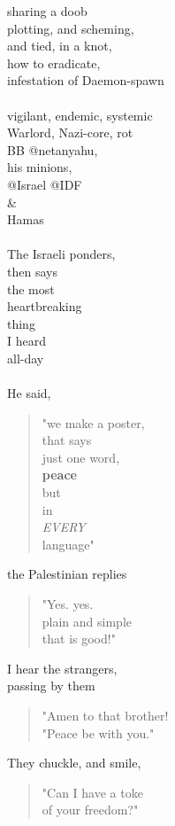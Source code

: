 \documentclass[16pt,openany,oneside]{book}
\begin{document}
sharing a doob \\
plotting, and scheming,\\
and tied, in a knot,\\
how to eradicate,\\
infestation of Daemon-spawn
\\\\
vigilant, endemic, systemic \\
Warlord, Nazi-core, rot\\
    BB @netanyahu,\\
    his minions,\\
    @Israel @IDF\\ 
    \& \\
    Hamas
\\\\    
The Israeli ponders,\\ 
then says\\
the most\\
heartbreaking\\
thing\\
I heard\\
all-day
\\\\
He said, \\
\begin{quote}
      "we make a poster,\\
           that says \\
           just one word,\\
          \textbf{peace}\\
          but\\
          in\\
          \textit{EVERY}\\
          language"
\end{quote}
the Palestinian replies
\begin{quote}
    "Yes. yes.\\
     plain and simple\\
     that is good!"
\end{quote}               
I hear the strangers,\\ 
passing by them\\
\begin{quote}
     "Amen to that brother!\\
      "Peace be with you."\\
\end{quote}      
They chuckle, and smile,\\
\begin{quote}
        "Can I have a toke\\
        of your freedom?"\\
\end{quote}                
\end{document}
